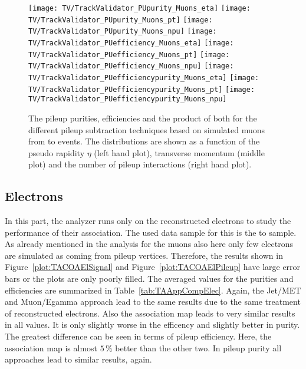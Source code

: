 \begin{figure}[h!t]
  \centering
  \texttt{[image: TV/TrackValidator\_PUpurity\_Muons\_eta]}
  \texttt{[image: TV/TrackValidator\_PUpurity\_Muons\_pt]}
  \texttt{[image: TV/TrackValidator\_PUpurity\_Muons\_npu]}
  \newline
  \texttt{[image: TV/TrackValidator\_PUefficiency\_Muons\_eta]}
  \texttt{[image: TV/TrackValidator\_PUefficiency\_Muons\_pt]}
  \texttt{[image: TV/TrackValidator\_PUefficiency\_Muons\_npu]}
  \newline
  \texttt{[image: TV/TrackValidator\_PUefficiencypurity\_Muons\_eta]}
  \texttt{[image: TV/TrackValidator\_PUefficiencypurity\_Muons\_pt]}
  \texttt{[image: TV/TrackValidator\_PUefficiencypurity\_Muons\_npu]}
  \caption[Pileup purity, efficiency and their product for the different pileup subtraction techniques based on simulated muons from \Zz to \MM events]{The pileup purities, efficiencies and the product of both for the different pileup subtraction techniques based on simulated muons from \Zz to \MM events. The distributions are shown as a function of the pseudo rapidity $\eta$ (left hand plot), transverse momentum (middle plot) and the number of pileup interactions (right hand plot). \label{plot:TACOAMuPileup}}
\end{figure}



\subsection{Electrons \label{sec:TASEFRDAE} }

In this part, the analyzer runs only on the reconstructed electrons to study the performance of their association. The used data sample for this is the \Zz to \EE sample. As already mentioned in the analysis for the muons also here only few electrons are simulated as coming from pileup vertices. Therefore, the results shown in Figure~\ref{plot:TACOAElSignal} and Figure~\ref{plot:TACOAElPileup} have large error bars or the plots are only poorly filled. The averaged values for the purities and efficiencies are summarized in Table~\ref{tab:TAAppCompElec}. Again, the Jet/MET and Muon/Egamma approach lead to the same results due to the same treatment of reconstructed electrons. Also the association map leads to very similar results in all values. It is only slightly worse in the efficency and slightly better in purity. The greatest difference can be seen in terms of pileup efficiency. Here, the association map is almost $5\,\%$ better than the other two. In pileup purity all approaches lead to similar results, again. 

